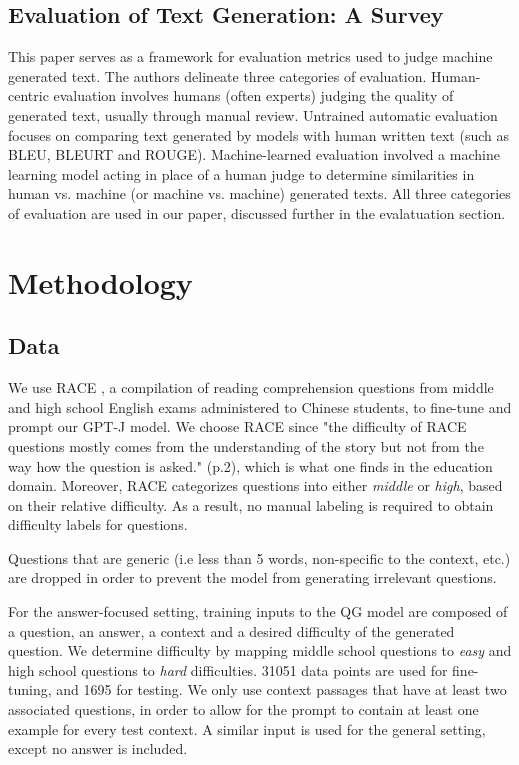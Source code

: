 \documentclass[11pt]{article}
\begin{document}
\subsection{Evaluation of Text Generation: A Survey}
This paper \citep{text-gen-survey:13} serves as a framework for evaluation metrics used to judge machine generated text. The authors delineate three categories of evaluation. Human-centric evaluation involves humans (often experts) judging the quality of generated text, usually through manual review. Untrained automatic evaluation focuses on comparing text generated by models with human written text (such as BLEU, BLEURT and ROUGE).  Machine-learned evaluation involved a machine learning model acting in place of a human judge to determine similarities in human vs. machine (or machine vs. machine) generated texts. All three categories of evaluation are used in our paper, discussed further in the evalatuation section.


\section{Methodology}

\subsection{Data}

We use RACE \citep{RACE:2}, a compilation of reading comprehension questions from middle and high school English exams administered to Chinese students, to fine-tune and prompt our GPT-J model. We choose RACE since "the difficulty of RACE questions mostly comes from the understanding of the story but not from the way how the question is asked." \citet{Difficulty:3} (p.2), which is what one finds in the education domain. Moreover, RACE categorizes questions into either \textit{middle} or \textit{high}, based on their relative difficulty. As a result, no manual labeling is required to obtain difficulty labels for questions.

Questions that are generic (i.e less than 5 words, non-specific to the context, etc.) are dropped in order to prevent the model from generating irrelevant questions.

For the answer-focused setting, training inputs to the QG model are composed of a question, an answer, a context and a desired difficulty of the generated question. We determine difficulty by mapping middle school questions to \textit{easy} and high school questions to \textit{hard} difficulties. 31051 data points are used for fine-tuning, and 1695 for testing. We only use context passages that have at least two associated questions, in order to allow for the prompt to contain at least one example for every test context. A similar input is used for the general setting, except no answer is included. 
\end{document}
